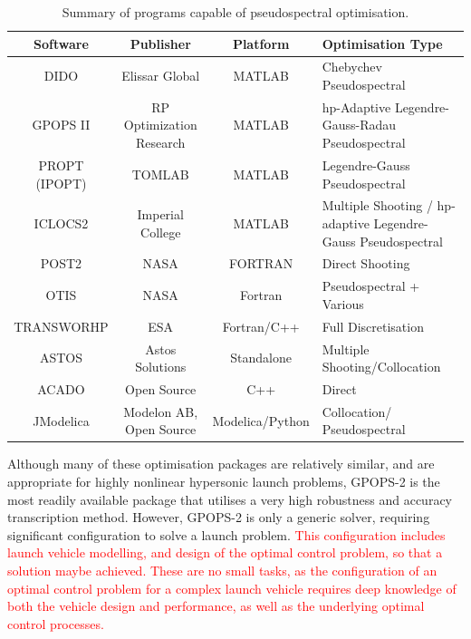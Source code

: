 \begin{table}[ht]
	
	\begin{tabular}{|c|c|c| p{4cm}|}
		\hline \textbf{Software} & \textbf{Publisher} & \textbf{Platform} & \textbf{Optimisation Type} \\ 
		\hline DIDO\cite{Ross2002} & Elissar Global & MATLAB & Chebychev Pseudospectral \\ 
		\hline GPOPS II\cite{Rao2010} & RP Optimization Research & MATLAB & \textsf{hp}-Adaptive Legendre-Gauss-Radau Pseudospectral \\ 
		\hline PROPT (IPOPT)\cite{Rutquist2010}& TOMLAB & MATLAB & Legendre-Gauss  Pseudospectral  \\ 
		\hline ICLOCS2\cite{iclocs} & Imperial College & MATLAB &  Multiple Shooting / \textsf{hp}-adaptive Legendre-Gauss Pseudospectral  \\ 
		\hline POST2\cite{WilliamColson} & NASA & FORTRAN & Direct Shooting \\ 
		\hline OTIS\cite{otis} & NASA  & Fortran & Pseudospectral + Various  \\ 
		\hline TRANSWORHP\cite{Wassel2013} & ESA & Fortran/C++ & Full Discretisation \\ 
		\hline ASTOS\cite{astos} & Astos Solutions & Standalone & Multiple Shooting/Collocation  \\  
		\hline ACADO\cite{Houska2011} & Open Source & C++ &  Direct \\  
		\hline JModelica\cite{jmodelica} & Modelon AB, Open Source & Modelica/Python &  Collocation/ Pseudospectral \\  
		
		\hline 
	\end{tabular} 
	
	\caption{Summary of programs capable of pseudospectral optimisation.}
	\label{table:programs}
\end{table}

Although many of these optimisation packages are relatively similar, and are appropriate for highly nonlinear hypersonic launch problems, GPOPS-2 is the most readily available package that utilises a very high robustness and accuracy transcription method. However, GPOPS-2 is only a generic solver, requiring significant configuration to solve a launch problem. \textcolor{red}{This configuration includes launch vehicle modelling, and design of the optimal control problem, so that a solution maybe achieved. These are no small tasks, as the configuration of an optimal control problem for a complex launch vehicle requires deep knowledge of both the vehicle design and performance, as well as the underlying optimal control processes\cite{XXX}. } 














